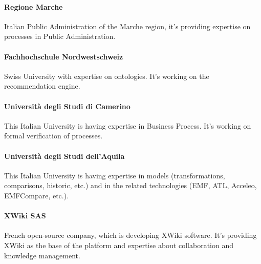 \documentclass{learnpad}
\begin{document}
\paragraph{Regione Marche}
Italian Public Administration of the Marche region, it's providing expertise on
processes in Public Administration.

\paragraph{Fachhochschule Nordwestschweiz}
Swiss University with expertise on ontologies.  It's working on the
recommendation engine.

\paragraph{Università degli Studi di Camerino}
This Italian University is having expertise in Business Process.  It's working
on formal verification of processes.

\paragraph{Università degli Studi dell'Aquila}
This Italian University is having expertise in models (transformations,
comparisons, historic, etc.) and in the related technologies (EMF, ATL, Acceleo,
EMFCompare, etc.).

\paragraph{XWiki SAS}
French open-source company, which is developing XWiki software.  It's providing
XWiki as the base of the \learnpad platform and expertise about collaboration
and knowledge management.







% 
% 
\end{document}
